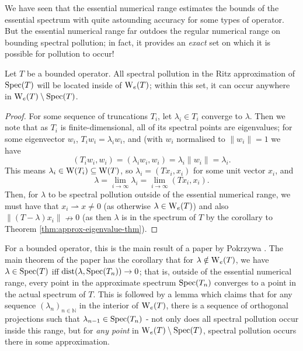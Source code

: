 \documentclass[../main.tex]{subfiles}
\begin{document}
We have seen that the essential numerical range estimates the bounds of the essential spectrum with quite astounding accuracy for some types of
operator. But the essential numerical range far outdoes the regular numerical range on bounding spectral pollution; in fact, it provides an \emph{exact}
set on which it is possible for pollution to occur! 

\begin{theorem}
Let $T$ be a bounded operator. All spectral pollution in the Ritz approximation of $\mathrm{Spec}(T)$ will be located inside of $\mathrm{W}_e(T)$; within this set, it can occur anywhere in $\mathrm{W}_e(T) \setminus \mathrm{Spec}(T)$.
\end{theorem}

\begin{proof}
For some sequence of truncations $T_i$, let $\lambda_i \in T_i$ converge to $\lambda$. Then we note that as $T_i$ is finite-dimensional, all of its
spectral points are eigenvalues; for some eigenvector $w_i$, $T_iw_i = \lambda_i w_i$, and (with $w_i$ normalised to $\|w_i\| = 1$ we have
$$(T_i w_i, w_i) = (\lambda_i w_i, w_i) = \lambda_i \|w_i\| = \lambda_i.$$
This means $\lambda_i \in \mathrm{W}(T_i) \subseteq \mathrm{W}(T)$, so $\lambda_i = (T x_i, x_i)$ for some unit vector $x_i$, and
$$\lambda = \lim_{i \rightarrow \infty} \lambda_i = \lim_{i \rightarrow \infty}(Tx_i, x_i).$$
Then, for $\lambda$ to be spectral pollution outside of the essential numerical range, we must have that $x_i \rightharpoonup x \neq 0$ (as otherwise
$\lambda \in \mathrm{W}_e(T)$) and also $\|(T - \lambda)x_i\| \nrightarrow 0$ (as then $\lambda$ is in the spectrum of $T$ by the corollary to Theorem \ref{thm:approx-eigenvalue-thm}).
\end{proof}

For a bounded operator, this is the main result of a paper by Pokrzywa \parencite{pokrzywa1979method}. The main theorem of the paper has the
corollary that for $\lambda \notin \mathrm{W}_e(T)$, we have $\lambda \in \mathrm{Spec}(T)$ iff $\text{dist}(\lambda, \mathrm{Spec}(T_n)) \rightarrow 0$; that is, outside of the
essential numerical range, every point in the approximate spectrum $\mathrm{Spec}(T_n)$ converges to a point in the actual spectrum of $T$. This is followed by
a lemma which claims that for any sequence $(\lambda_n)_{n \in \mathbb{N}}$ in the interior of $\mathrm{W}_e(T)$, there is a sequence of orthogonal projections such that $\lambda_{n-1} \in \mathrm{Spec}(T_n)$ - not only does all spectral pollution occur inside this range, but for \emph{any point} in 
$\mathrm{W}_e(T) \setminus \mathrm{Spec}(T)$, spectral pollution occurs there in some approximation.
\end{document}

